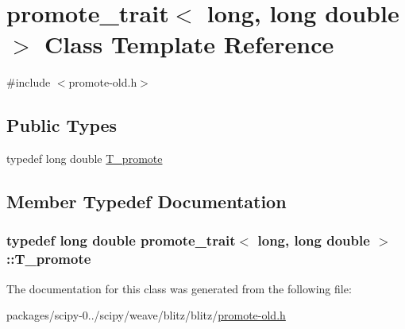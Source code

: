\hypertarget{classpromote__trait_3_01long_00_01long_01double_01_4}{}\section{promote\+\_\+trait$<$ long, long double $>$ Class Template Reference}
\label{classpromote__trait_3_01long_00_01long_01double_01_4}


{\ttfamily \#include $<$promote-\/old.\+h$>$}

\subsection*{Public Types}
\begin{DoxyCompactItemize}
\item 
typedef long double \hyperlink{classpromote__trait_3_01long_00_01long_01double_01_4_a6bb62cbab8de386be4082866cf0be417}{T\+\_\+promote}
\end{DoxyCompactItemize}


\subsection{Member Typedef Documentation}
\hypertarget{classpromote__trait_3_01long_00_01long_01double_01_4_a6bb62cbab8de386be4082866cf0be417}{}
\subsubsection[{T\+\_\+promote}]{\setlength{\rightskip}{0pt plus 5cm}typedef long double {\bf promote\+\_\+trait}$<$ long, long double $>$\+::{\bf T\+\_\+promote}}\label{classpromote__trait_3_01long_00_01long_01double_01_4_a6bb62cbab8de386be4082866cf0be417}


The documentation for this class was generated from the following file\+:\begin{DoxyCompactItemize}
\item 
packages/scipy-\/0../scipy/weave/blitz/blitz/\hyperlink{promote-old_8h}{promote-\/old.\+h}\end{DoxyCompactItemize}

